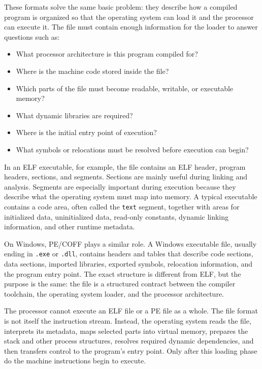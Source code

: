 These formats solve the same basic problem: they describe how a compiled program is organized so that the operating system can load it and the processor can execute it. The file must contain enough information for the loader to answer questions such as:

\begin{itemize}
    \item What processor architecture is this program compiled for?
    \item Where is the machine code stored inside the file?
    \item Which parts of the file must become readable, writable, or executable memory?
    \item What dynamic libraries are required?
    \item Where is the initial entry point of execution?
    \item What symbols or relocations must be resolved before execution can begin?
\end{itemize}

In an ELF executable, for example, the file contains an ELF header, program headers, sections, and segments. Sections are mainly useful during linking and analysis. Segments are especially important during execution because they describe what the operating system must map into memory. A typical executable contains a code area, often called the \texttt{text} segment, together with areas for initialized data, uninitialized data, read-only constants, dynamic linking information, and other runtime metadata.

On Windows, PE/COFF plays a similar role. A Windows executable file, usually ending in \texttt{.exe} or \texttt{.dll}, contains headers and tables that describe code sections, data sections, imported libraries, exported symbols, relocation information, and the program entry point. The exact structure is different from ELF, but the purpose is the same: the file is a structured contract between the compiler toolchain, the operating system loader, and the processor architecture.

The processor cannot execute an ELF file or a PE file as a whole. The file format is not itself the instruction stream. Instead, the operating system reads the file, interprets its metadata, maps selected parts into virtual memory, prepares the stack and other process structures, resolves required dynamic dependencies, and then transfers control to the program's entry point. Only after this loading phase do the machine instructions begin to execute.

